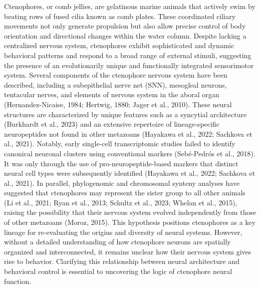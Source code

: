 \documentclass[
  11pt,
]{article}
\begin{document}
Ctenophores, or comb jellies, are gelatinous marine animals that
actively swim by beating rows of fused cilia known as comb plates. These
coordinated ciliary movements not only generate propulsion but also
allow precise control of body orientation and directional changes within
the water column. Despite lacking a centralized nervous system,
ctenophores exhibit sophisticated and dynamic behavioral patterns and
respond to a broad range of external stimuli, suggesting the presence of
an evolutionarily unique and functionally integrated sensorimotor
system. Several components of the ctenophore nervous system have been
described, including a subepithelial nerve net (SNN), mesogleal neurons,
tentacular nerves, and elements of nervous system in the aboral organ
(Hernandez-Nicaise, 1984; Hertwig, 1880; Jager et al., 2010). These
neural structures are characterized by unique features such as a
syncytial architecture (Burkhardt et al., 2023) and an extensive
repertoire of lineage-specific neuropeptides not found in other
metazoans (Hayakawa et al., 2022; Sachkova et al., 2021). Notably, early
single-cell transcriptomic studies failed to identify canonical neuronal
clusters using conventional markers (Sebé-Pedrós et al., 2018). It was
only through the use of pro-neuropeptide-based markers that distinct
neural cell types were subsequently identified (Hayakawa et al., 2022;
Sachkova et al., 2021). In parallel, phylogenomic and chromosomal
synteny analyses have suggested that ctenophores may represent the
sister group to all other animals (Li et al., 2021; Ryan et al., 2013;
Schultz et al., 2023; Whelan et al., 2015), raising the possibility that
their nervous system evolved independently from those of other metazoans
(Moroz, 2015). This hypothesis positions ctenophores as a key lineage
for re-evaluating the origins and diversity of neural systems. However,
without a detailed understanding of how ctenophore neurons are spatially
organized and interconnected, it remains unclear how their nervous
system gives rise to behavior. Clarifying this relationship between
neural architecture and behavioral control is essential to uncovering
the logic of ctenophore neural function.
\end{document}

